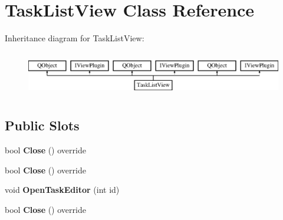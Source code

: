 \hypertarget{class_task_list_view}{}\section{Task\+List\+View Class Reference}
\label{class_task_list_view}
Inheritance diagram for Task\+List\+View\+:\begin{figure}[H]
\begin{center}
\leavevmode
\includegraphics[height=2.000000cm]{class_task_list_view}
\end{center}
\end{figure}
\subsection*{Public Slots}
\begin{DoxyCompactItemize}
\item 
\mbox{\label{class_task_list_view_a6ddab6bcf6d184734ca12cf838c6637d}} 
bool {\bfseries Close} () override
\item 
\mbox{\label{class_task_list_view_a6ddab6bcf6d184734ca12cf838c6637d}} 
bool {\bfseries Close} () override
\item 
\mbox{\label{class_task_list_view_a19bafc081f151ea0e27dc0c7cae99c2f}} 
void {\bfseries Open\+Task\+Editor} (int id)
\item 
\mbox{\label{class_task_list_view_a6ddab6bcf6d184734ca12cf838c6637d}} 
bool {\bfseries Close} () override
\end{DoxyCompactItemize}
